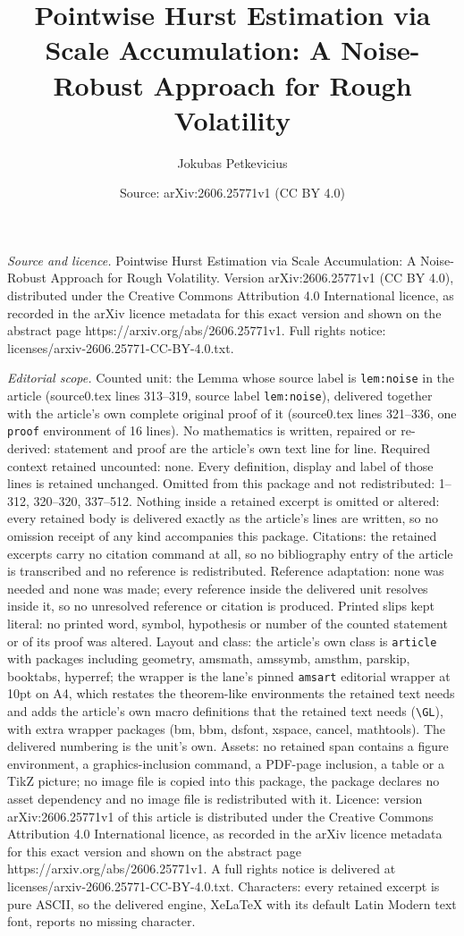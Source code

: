 \documentclass[10pt,a4paper]{amsart}
\title[Pointwise Hurst Estimation via Scale Accumulation: A Noise-R]{Pointwise Hurst Estimation via Scale Accumulation: A Noise-Robust Approach for Rough Volatility}
\author{Jokubas Petkevicius}
\date{Source: arXiv:2606.25771v1 (CC BY 4.0)}
\begin{document}
\maketitle

\noindent\emph{Source and licence.} Pointwise Hurst Estimation via Scale Accumulation: A Noise-Robust Approach for Rough Volatility. Version arXiv:2606.25771v1 (CC BY 4.0), distributed under the Creative Commons Attribution 4.0 International licence, as recorded in the arXiv licence metadata for this exact version and shown on the abstract page https://arxiv.org/abs/2606.25771v1. Full rights notice: licenses/arxiv-2606.25771-CC-BY-4.0.txt.\par\smallskip

\noindent\textit{Editorial scope.} Counted unit: the Lemma whose source label is \texttt{lem:noise} in the article (source0.tex lines 313--319, source label \texttt{lem:noise}), delivered together with the article's own complete original proof of it (source0.tex lines 321--336, one \texttt{proof} environment of 16 lines). No mathematics is written, repaired or re-derived: statement and proof are the article's own text line for line. Required context retained uncounted: none. Every definition, display and label of those lines is retained unchanged. Omitted from this package and not redistributed: 1--312, 320--320, 337--512. Nothing inside a retained excerpt is omitted or altered: every retained body is delivered exactly as the article's lines are written, so no omission receipt of any kind accompanies this package. Citations: the retained excerpts carry no citation command at all, so no bibliography entry of the article is transcribed and no reference is redistributed. Reference adaptation: none was needed and none was made; every reference inside the delivered unit resolves inside it, so no unresolved reference or citation is produced. Printed slips kept literal: no printed word, symbol, hypothesis or number of the counted statement or of its proof was altered. Layout and class: the article's own class is \texttt{article} with packages including geometry, amsmath, amssymb, amsthm, parskip, booktabs, hyperref; the wrapper is the lane's pinned \texttt{amsart} editorial wrapper at 10pt on A4, which restates the theorem-like environments the retained text needs and adds the article's own macro definitions that the retained text needs (\texttt{\textbackslash GL}), with extra wrapper packages (bm, bbm, dsfont, xspace, cancel, mathtools). The delivered numbering is the unit's own. Assets: no retained span contains a figure environment, a graphics-inclusion command, a PDF-page inclusion, a table or a TikZ picture; no image file is copied into this package, the package declares no asset dependency and no image file is redistributed with it. Licence: version arXiv:2606.25771v1 of this article is distributed under the Creative Commons Attribution 4.0 International licence, as recorded in the arXiv licence metadata for this exact version and shown on the abstract page https://arxiv.org/abs/2606.25771v1. A full rights notice is delivered at licenses/arxiv-2606.25771-CC-BY-4.0.txt. Characters: every retained excerpt is pure ASCII, so the delivered engine, XeLaTeX with its default Latin Modern text font, reports no missing character.
\end{document}
